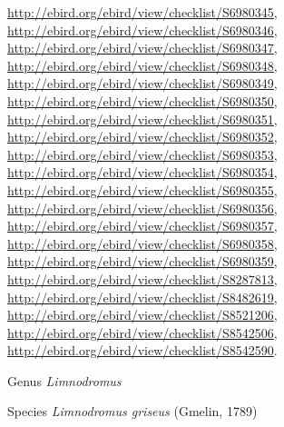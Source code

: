 \documentclass[9pt, article]{memoir}
\begin{document}
\begin{multicols}{2}
\url{http://ebird.org/ebird/view/checklist/S6980345}, 
\url{http://ebird.org/ebird/view/checklist/S6980346}, 
\url{http://ebird.org/ebird/view/checklist/S6980347}, 
\url{http://ebird.org/ebird/view/checklist/S6980348}, 
\url{http://ebird.org/ebird/view/checklist/S6980349}, 
\url{http://ebird.org/ebird/view/checklist/S6980350}, 
\url{http://ebird.org/ebird/view/checklist/S6980351}, 
\url{http://ebird.org/ebird/view/checklist/S6980352}, 
\url{http://ebird.org/ebird/view/checklist/S6980353}, 
\url{http://ebird.org/ebird/view/checklist/S6980354}, 
\url{http://ebird.org/ebird/view/checklist/S6980355}, 
\url{http://ebird.org/ebird/view/checklist/S6980356}, 
\url{http://ebird.org/ebird/view/checklist/S6980357}, 
\url{http://ebird.org/ebird/view/checklist/S6980358}, 
\url{http://ebird.org/ebird/view/checklist/S6980359}, 
\url{http://ebird.org/ebird/view/checklist/S8287813}, 
\url{http://ebird.org/ebird/view/checklist/S8482619}, 
\url{http://ebird.org/ebird/view/checklist/S8521206}, 
\url{http://ebird.org/ebird/view/checklist/S8542506}, 
\url{http://ebird.org/ebird/view/checklist/S8542590}.

\vspace{6pt}\noindent\hspace{30pt}Genus \textit{Limnodromus}


\vspace{6pt}\noindent\hspace{36pt}Species \textit{Limnodromus griseus} (Gmelin, 1789)



\end{multicols}
\end{document}

